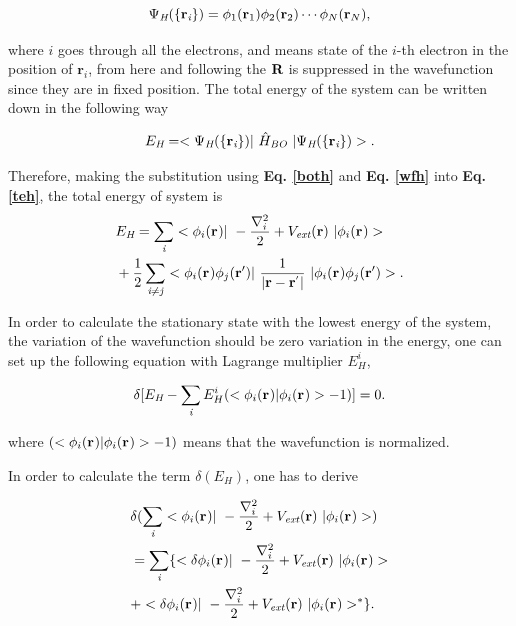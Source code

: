 \documentclass[a4paper, 12pt, titlepage,oneside,drop]{kthesis}
\begin{document}
\begin{equation}\label{wfh}
\wfh = \bwf<1><1> \bwf<2><2> \cdots \bwf<N><N>, 
\end{equation}

where $i$ goes through all the electrons, and  means state of the $i$-th electron in the position of ${\textbf{r}}_{\textit{i}}$, 
from here and following the $\textbf R$ is suppressed in the wavefunction since they are in fixed position. The total energy of the system can be written down 
in the following way

\begin{equation}\label{teh}
E_{\textit{H}} = <\Psi_{{\textit H}}(\{ {\textbf r}_{{\textit i}}\}) |\ {\hat{H}}_{\textit{BO}} \ | \Psi_{{\textit H}}(\{ {\textbf r}_{{\textit i}}\})  >.
\end{equation}

Therefore, making the substitution using \textbf{Eq. \ref{both}} and \textbf{Eq. \ref{wfh}} into \textbf{Eq. \ref{teh}}, the total energy of system is
\begin{equation}\begin{split}
&E_\textit{H} = \sumi<i> <\bwf<i><> |\ -\frac{\nabla^{2}_{i}}{2} + V_\textit{ext}(\textbf{r})  \ | \bwf<i><> > \\
& +\frac{1}{2} \suminj<i><j> <\bwf<i><> \bwfn<j><'>|\ \frac{1}{|\textbf{r} - \textbf{r}^{'} |} \ | \bwf<i><> \bwfn<j><'>>.
\end{split}\end{equation}

In order to calculate the stationary state with the lowest energy of the system, the variation of the wavefunction should be
zero variation in the energy, one can set up the following equation with Lagrange multiplier $E^{i}_H$,

\begin{equation}\label{haa}
 \delta [ E_{\textit{H}} - \sumi<i> E^{i}_{H} (<\bwf<i><> | \bwf<i><> > -1)] = 0. 
\end{equation}

where $(<\bwf<i><> | \bwf<i><> > -1)$ means that the wavefunction is normalized.

In order to calculate the term $\delta ( E_{\textit{H}} ) $, one has to derive

\begin{equation}\begin{split}\label{hartree1}
& \delta ( \sumi<i> <\bwf<i><> |\ -\frac{\nabla^{2}_{ i}}{2} + V_\textit{ext}(\textbf{r})  \ | \bwf<i><> > ) \\
&  = \sumi<i> \{ < \delta \bwf<i><> |\ -\frac{\nabla^{2}_{i}}{2} + V_\textit{ext}(\textbf{r})  \ | \bwf<i><> >  \\
&  + <  \delta \bwf<i><> |\ -\frac{\nabla^{2}_{i}}{2} + V_\textit{ext}(\textbf{r})  \ |  \bwf<i><> >^{\ast} \}.
\end{split}\end{equation}
\end{document}
